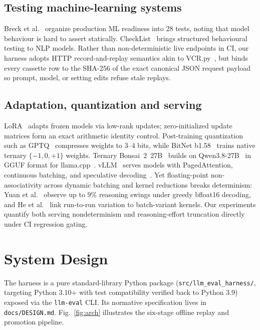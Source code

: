 \documentclass[conference]{IEEEtran}
\begin{document}
\subsection{Testing machine-learning systems}
\label{sec:related-mltest}

Breck et al.~\cite{breck2017mltestscore} organize production ML readiness into 28 tests, noting that model behaviour is hard to assert statically. CheckList~\cite{ribeiro2020checklist} brings structured behavioural testing to NLP models. Rather than non-deterministic live endpoints in CI, our harness adopts HTTP record-and-replay semantics akin to VCR.py~\cite{vcrpy}, but binds every cassette row to the SHA-256 of the exact canonical JSON request payload so prompt, model, or setting edits refuse stale replays.

\subsection{Adaptation, quantization and serving}
\label{sec:related-serving}

LoRA~\cite{hu2022lora} adapts frozen models via low-rank updates; zero-initialized update matrices form an exact arithmetic identity control. Post-training quantization such as GPTQ~\cite{frantar2023gptq} compresses weights to 3--4 bits, while BitNet b1.58~\cite{ma2024bitnet} trains native ternary $\{-1, 0, +1\}$ weights. Ternary Bonsai~2~27B~\cite{bonsai2} builds on Qwen3.8-27B~\cite{qwen38card} in GGUF format for llama.cpp~\cite{llamacpp}. vLLM~\cite{kwon2023vllm} serves models with PagedAttention, continuous batching, and speculative decoding~\cite{leviathan2023speculative}. Yet floating-point non-associativity across dynamic batching and kernel reductions breaks determinism: Yuan et al.~\cite{yuan2025nondeterminism} observe up to 9\% reasoning swings under greedy bfloat16 decoding, and He et al.~\cite{he2025nondeterminism} link run-to-run variation to batch-variant kernels. Our experiments quantify both serving nondeterminism and reasoning-effort truncation directly under CI regression gating.

\section{System Design}
\label{sec:design}

The harness is a pure standard-library Python package (\texttt{src/\allowbreak{}llm\_\allowbreak{}eval\_\allowbreak{}harness/\allowbreak{}}, targeting Python 3.10+ with test compatibility verified back to Python 3.9) exposed via the \texttt{llm-{}eval} CLI. Its normative specification lives in \texttt{docs/\allowbreak{}DESIGN.\allowbreak{}md}. Fig.~\ref{fig:arch} illustrates the six-stage offline replay and promotion pipeline.
\end{document}
